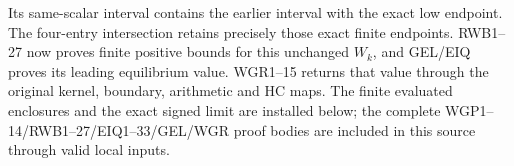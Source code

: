 Its same-scalar interval contains the earlier interval with
the exact low endpoint. The four-entry intersection retains precisely
those exact finite endpoints. RWB1--27 now proves finite positive
bounds for this unchanged $W_k$, and GEL/EIQ proves its leading
equilibrium value. WGR1--15 returns that value through the original
kernel, boundary, arithmetic and HC maps. The finite evaluated
enclosures and the exact signed limit are installed below; the
complete WGP1--14/RWB1--27/EIQ1--33/GEL/WGR proof bodies are
included in this source through valid local inputs.